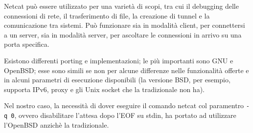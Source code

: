 Netcat può essere utilizzato per una varietà di scopi, tra cui il debugging delle connessioni di rete, il trasferimento di file, la creazione di tunnel e la comunicazione tra sistemi. Può funzionare sia in modalità client, per connettersi a un server, sia in modalità server, per ascoltare le connessioni in arrivo su una porta specifica.

Esistono differenti porting e implementazioni; le più importanti sono GNU e OpenBSD; esse sono simili se non per alcune differenze nelle funzionalità offerte e in alcuni parametri di esecuzione disponibili (la versione BSD, per esempio, supporta IPv6, proxy e gli Unix socket che la tradizionale non ha). 

Nel nostro caso, la necessità di dover eseguire il comando netcat col paramentro \verb|-q 0|, ovvero disabilitare l'attesa dopo l'EOF su stdin, ha portato ad utilizzare l'OpenBSD anzichè la tradizionale.